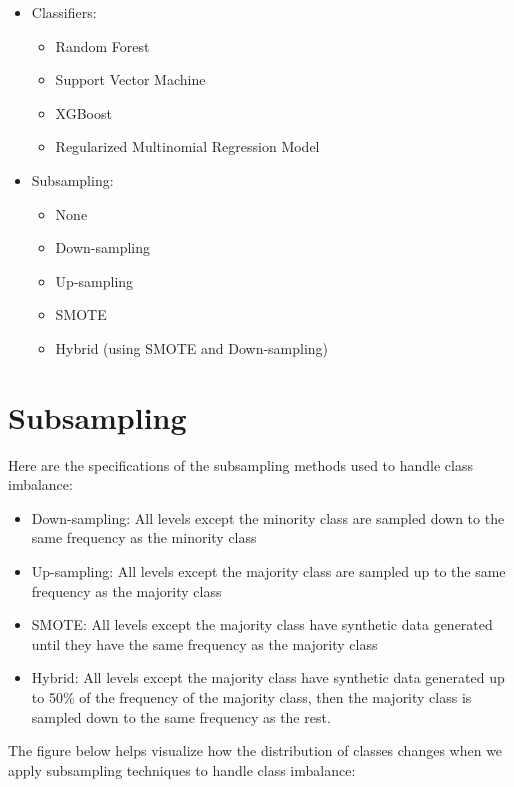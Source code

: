\documentclass[
]{report}
\providecommand{\tightlist}{%
  \setlength{\itemsep}{0pt}\setlength{\parskip}{0pt}}
\begin{document}
\begin{itemize}
\item
  Classifiers:

  \begin{itemize}
  \tightlist
  \item
    Random Forest
  \item
    Support Vector Machine
  \item
    XGBoost
  \item
    Regularized Multinomial Regression Model
  \end{itemize}
\item
  Subsampling:

  \begin{itemize}
  \tightlist
  \item
    None
  \item
    Down-sampling
  \item
    Up-sampling
  \item
    SMOTE
  \item
    Hybrid (using SMOTE and Down-sampling)
  \end{itemize}
\end{itemize}

\hypertarget{subsampling}{%
\section{Subsampling}\label{subsampling}}

Here are the specifications of the subsampling methods used to handle class imbalance:

\begin{itemize}
\tightlist
\item
  Down-sampling: All levels except the minority class are sampled down to the same frequency as the minority class
\item
  Up-sampling: All levels except the majority class are sampled up to the same frequency as the majority class
\item
  SMOTE: All levels except the majority class have synthetic data generated until they have the same frequency as the majority class
\item
  Hybrid: All levels except the majority class have synthetic data generated up to 50\% of the frequency of the majority class, then the majority class is sampled down to the same frequency as the rest.
\end{itemize}

The figure below helps visualize how the distribution of classes changes when we apply subsampling techniques to handle class imbalance:
\end{document}
